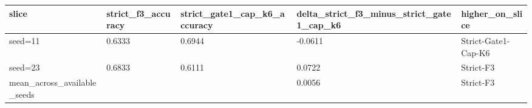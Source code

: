 \begin{tabular}{lllll}
\hline
slice & strict\_f3\_accuracy & strict\_gate1\_cap\_k6\_accuracy & delta\_strict\_f3\_minus\_strict\_gate1\_cap\_k6 & higher\_on\_slice \\
\hline
seed=11 & 0.6333 & 0.6944 & -0.0611 & Strict-Gate1-Cap-K6 \\
seed=23 & 0.6833 & 0.6111 & 0.0722 & Strict-F3 \\
mean\_across\_available\_seeds &  &  & 0.0056 & Strict-F3 \\
\hline
\end{tabular}
